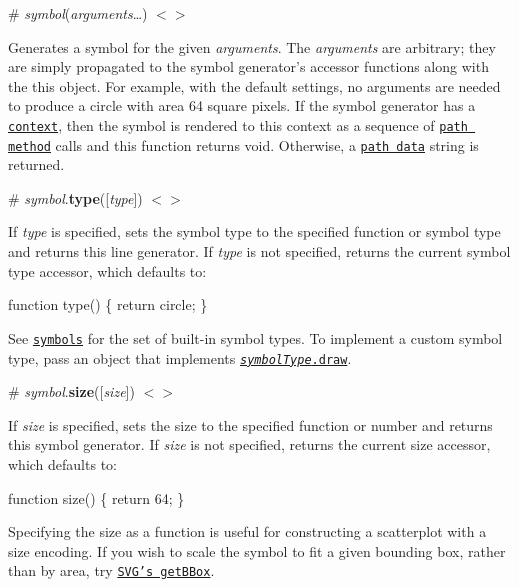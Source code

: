 \label{__symbol}%
\# {\itshape symbol}({\itshape arguments}…) \href{https://github.com/d3/d3-shape/blob/master/src/symbol.js#L11}{\tt $<$$>$}

Generates a symbol for the given {\itshape arguments}. The {\itshape arguments} are arbitrary; they are simply propagated to the symbol generator’s accessor functions along with the {\ttfamily this} object. For example, with the default settings, no arguments are needed to produce a circle with area 64 square pixels. If the symbol generator has a \href{#symbol_context}{\tt context}, then the symbol is rendered to this context as a sequence of \href{http://www.w3.org/TR/2dcontext/#canvaspathmethods}{\tt path method} calls and this function returns void. Otherwise, a \href{http://www.w3.org/TR/SVG/paths.html#PathData}{\tt path data} string is returned.

\label{_symbol_type}%
\# {\itshape symbol}.{\bfseries type}(\mbox{[}{\itshape type}\mbox{]}) \href{https://github.com/d3/d3-shape/blob/master/src/symbol.js#L33}{\tt $<$$>$}

If {\itshape type} is specified, sets the symbol type to the specified function or symbol type and returns this line generator. If {\itshape type} is not specified, returns the current symbol type accessor, which defaults to\+:


\begin{DoxyCode}
function type() \{
  return circle;
\}
\end{DoxyCode}


See \href{#symbols}{\tt symbols} for the set of built-\/in symbol types. To implement a custom symbol type, pass an object that implements \href{#symbolType_draw}{\tt {\itshape symbol\+Type}.draw}.

\label{_symbol_size}%
\# {\itshape symbol}.{\bfseries size}(\mbox{[}{\itshape size}\mbox{]}) \href{https://github.com/d3/d3-shape/blob/master/src/symbol.js#L37}{\tt $<$$>$}

If {\itshape size} is specified, sets the size to the specified function or number and returns this symbol generator. If {\itshape size} is not specified, returns the current size accessor, which defaults to\+:


\begin{DoxyCode}
function size() \{
  return 64;
\}
\end{DoxyCode}


Specifying the size as a function is useful for constructing a scatterplot with a size encoding. If you wish to scale the symbol to fit a given bounding box, rather than by area, try \href{http://bl.ocks.org/mbostock/3dd515e692504c92ab65}{\tt S\+V\+G’s get\+B\+Box}.

